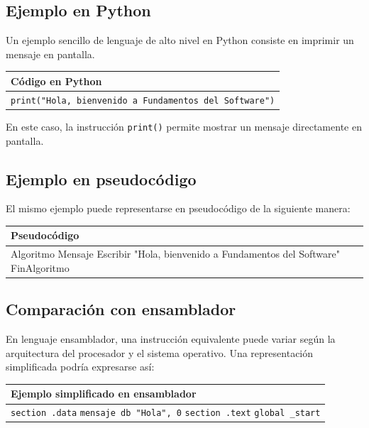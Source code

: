 \documentclass[12pt,a4paper]{article}
\begin{document}
	\subsection{Ejemplo en Python}
	
	Un ejemplo sencillo de lenguaje de alto nivel en Python consiste en imprimir un mensaje en pantalla.
	
	\begin{center}
		\begin{tabular}{|p{13cm}|}
			\hline
			\textbf{Código en Python} \\ \hline
			\texttt{print("Hola, bienvenido a Fundamentos del Software")} \\ \hline
		\end{tabular}
	\end{center}
	
	En este caso, la instrucción \texttt{print()} permite mostrar un mensaje directamente en pantalla.
	
	\subsection{Ejemplo en pseudocódigo}
	
	El mismo ejemplo puede representarse en pseudocódigo de la siguiente manera:
	
	\begin{center}
		\begin{tabular}{|p{13cm}|}
			\hline
			\textbf{Pseudocódigo} \\ \hline
			Algoritmo Mensaje\newline
			\hspace*{0.5cm} Escribir "Hola, bienvenido a Fundamentos del Software"\newline
			FinAlgoritmo \\ \hline
		\end{tabular}
	\end{center}
	
	\subsection{Comparación con ensamblador}
	
	En lenguaje ensamblador, una instrucción equivalente puede variar según la arquitectura del procesador y el sistema operativo. Una representación simplificada podría expresarse así:
	
	\begin{center}
		\begin{tabular}{|p{13cm}|}
			\hline
			\textbf{Ejemplo simplificado en ensamblador} \\ \hline
			\texttt{section .data}\newline
			\texttt{mensaje db "Hola", 0}\newline
			\texttt{section .text}\newline
			\texttt{global \_start} \\ \hline
		\end{tabular}
	\end{center}
	
\end{document}
